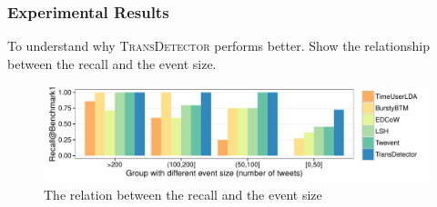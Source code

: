 \documentclass{beamer}
\begin{document}
\begin{frame}
\frametitle{Experimental Results}
To understand why \textsc{TransDetector} performs better.
\vfill
Show the relationship between the recall and the event size.
\begin{figure}[h]
	\setlength{\abovecaptionskip}{0.cm}
	\setlength{\belowcaptionskip}{0.cm}
        \centering
        \includegraphics[width=1.0\columnwidth]{img/barchartOnBenchmark1.pdf}
        \caption{The relation between the recall and the event size}
        \label{fig:Benchmark1}
\end{figure}
\end{frame}
\end{document}
